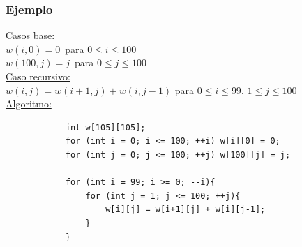 \documentclass{beamer}
\begin{document}
	\begin{frame}[fragile]
		\frametitle{Ejemplo}
		\underline{Casos base:}\\
		$w(i, 0) = 0  \,$ \quad para $0 \leq i \leq 100$\\
		$w(100, j) = j\,$ para $0 \leq j \leq 100$\\
		\underline{Caso recursivo:}\\
		$w(i, j) = w(i+1, j) + w(i, j-1)$ para $0 \leq i \leq 99$, $1 \leq j \leq 100$ \\
		\underline{Algoritmo:}
		\begin{lstlisting}
			int w[105][105];
			for (int i = 0; i <= 100; ++i) w[i][0] = 0; 
			for (int j = 0; j <= 100; ++j) w[100][j] = j;
		
			for (int i = 99; i >= 0; --i){
			    for (int j = 1; j <= 100; ++j){
			        w[i][j] = w[i+1][j] + w[i][j-1];
			    }
			}
		\end{lstlisting}
	\end{frame}
\end{document}
